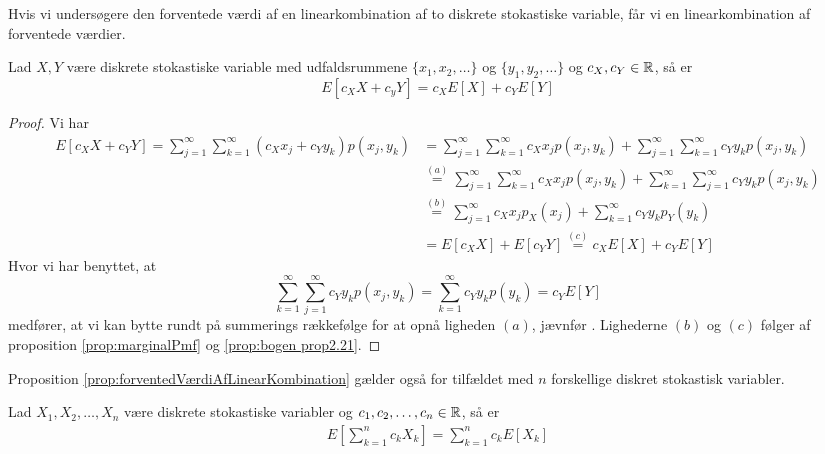 Hvis vi undersøgere den forventede værdi af en linearkombination af to diskrete stokastiske variable, får vi en linearkombination af forventede værdier.
\begin{prop}\label{prop:forventedVærdiAfLinearKombination} %
Lad $X, Y$ være diskrete stokastiske variable med udfaldsrummene $\{x_1, x_2, \ldots \}$ og $\{y_1, y_2, \ldots \}$ og $c_X, c_Y \in \mathbb{R}$, så er
\begin{equation*}
    E[c_XX+c_yY] = c_XE[X] + c_YE[Y]
\end{equation*}


\end{prop}
\begin{proof}
Vi har
\begin{align*}
    E[c_X X + c_Y Y] = \sum^\infty_{j = 1} \sum^\infty_{k = 1} (c_X x_j + c_Y y_k) p(x_j, y_k) &= \sum^\infty_{j = 1} \sum^\infty_{k = 1} c_X x_j p(x_j, y_k) + \sum^\infty_{j = 1} \sum^\infty_{k = 1} c_Y y_k p(x_j, y_k) \\
    &\stackrel{(a)}= \sum^\infty_{j = 1} \sum^\infty_{k = 1} c_X x_j p(x_j, y_k) + \sum^\infty_{k = 1} \sum^\infty_{j = 1} c_Y y_k p(x_j, y_k) \\
    &\stackrel{(b)}= \sum^\infty_{j = 1} c_X x_j p_X(x_j) + \sum^\infty_{k = 1} c_Y y_k p_Y(y_k)\\
    &= E[c_X X] +  E[c_Y Y] \stackrel{(c)}= c_X E[X] + c_Y E[Y]
\end{align*}
Hvor vi har benyttet, at 
\begin{equation*}
    \sum^\infty_{k = 1} \sum^\infty_{j = 1} c_Y y_k p(x_j, y_k) = \sum^\infty_{k = 1} c_Y y_k p(y_k) = c_YE[Y]
\end{equation*}
medfører, at vi kan bytte rundt på summerings rækkefølge for at opnå ligheden $(a)$, jævnfør \cite{horiaPowerSerieNoter}.
Lighederne $(b)$ og $(c)$ følger af proposition \ref{prop:marginalPmf} og \ref{prop:bogen prop2.21}.
\end{proof}

Proposition \ref{prop:forventedVærdiAfLinearKombination} gælder også for tilfældet med $n$ forskellige diskret stokastisk variabler.
\begin{cor} %
Lad $X_1, X_2, \ldots, X_n$ være diskrete stokastiske variabler og $c_1, c_2, \ldots, c_n \in \mathbb{R}$, så er 
\begin{align*}
    E\left[\sum^n_{k = 1} c_k X_k\right] = \sum^n_{k = 1} c_k E[X_k]
\end{align*}
\end{cor}

